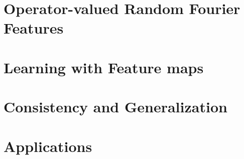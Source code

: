 
\chapter{Operator-valued Random Fourier Features}
\label{ch:operator-valued_random_fourier_features}


\chapter{Learning with Feature maps}
\label{ch:learning operator-valued_random_fourier_features}


\chapter{Consistency and Generalization} %
\label{ch:concistency_and_generalization}


\chapter{Applications} %
\label{ch:applications}

